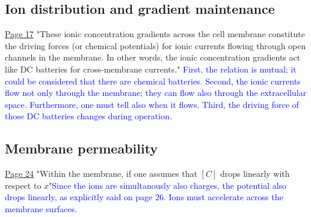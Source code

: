 \subsection{Ion distribution and gradient maintenance\label{sec:Physics-IonDistribution}}
\href{https://rcweb.dartmouth.edu/~mvdm/wiki/lib/exe/fetch.php?media=analysis:johnstonwu.pdf}{Page 17} "These ionic concentration gradients across the cell membrane constitute the driving forces
(or chemical potentials) for ionic currents flowing through open channels
in the membrane. In other words, the ionic concentration gradients act
like DC batteries for cross-membrane currents."
\textcolor{blue}{First, the relation is mutual; it could be considered that
there are chemical batteries. Second, the  ionic currents flow not only through the membrane; they can flow also through the extracellular space. Furthermore, one must tell also when it flows. Third, the driving force
of those DC batteries changes during operation.
}

\subsection{Membrane permeability\label{sec:Physics-MembranePermeability}}
\href{https://rcweb.dartmouth.edu/~mvdm/wiki/lib/exe/fetch.php?media=analysis:johnstonwu.pdf}{Page 24} "Within the membrane, if one assumes that $[C]$ drops linearly with respect to $x$"\textcolor{blue}{Since the ions are simultanously also charges, the potential also drops linearly, as explicitly said on page 26. Ions must accelerate across the membrane surfaces.}



